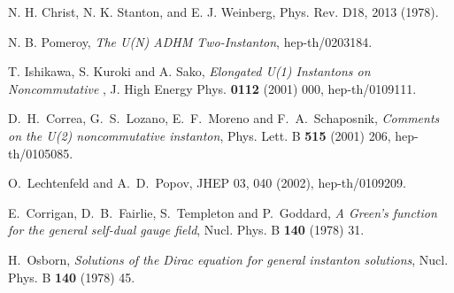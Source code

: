 \documentclass[a4paper,a4paper]{article}
\begin{document}
\begin{thebibliography}{99}
 N. H. Christ, N. K. Stanton, and E. J. Weinberg, Phys. Rev. D18,
2013 (1978).

 N. B. Pomeroy, {\it The U(N) ADHM
Two-Instanton}, hep-th/0203184.

 T. Ishikawa, S. Kuroki and A. Sako, {\it Elongated
U(1) Instantons on Noncommutative \coordHE{}}, J. High Energy Phys.
{\bf 0112} (2001) 000, hep-th/0109111.

 D.~H.~Correa, G.~S.~Lozano, E.~F.~Moreno and F.~A.~Schaposnik,
{\it Comments on the U(2) noncommutative instanton}, Phys. Lett. B
{\bf 515} (2001) 206, hep-th/0105085.

 O.~Lechtenfeld and A.~D.~Popov, JHEP 03, 040 (2002), hep-th/0109209.

 E.~Corrigan, D.~B.~Fairlie, S.~Templeton and
P.~Goddard, {\it A Green's function for the general self-dual
gauge field}, Nucl. Phys. B {\bf 140} (1978) 31.

 H.~Osborn, {\it Solutions of the Dirac equation for general instanton
solutions}, Nucl. Phys. B {\bf 140} (1978) 45.

\end{thebibliography}
\end{document}
